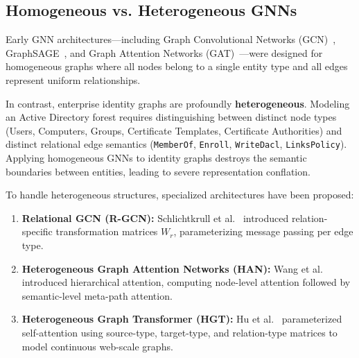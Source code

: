 \subsection{Homogeneous vs. Heterogeneous GNNs}
Early GNN architectures---including Graph Convolutional Networks (GCN)~\cite{kipf2017semi}, GraphSAGE~\cite{hamilton2017inductive}, and Graph Attention Networks (GAT)~\cite{velickovic2018graph}---were designed for homogeneous graphs where all nodes belong to a single entity type and all edges represent uniform relationships.

In contrast, enterprise identity graphs are profoundly \textbf{heterogeneous}. Modeling an Active Directory forest requires distinguishing between distinct node types (Users, Computers, Groups, Certificate Templates, Certificate Authorities) and distinct relational edge semantics (\texttt{MemberOf}, \texttt{Enroll}, \texttt{WriteDacl}, \texttt{LinksPolicy}). Applying homogeneous GNNs to identity graphs destroys the semantic boundaries between entities, leading to severe representation conflation.

To handle heterogeneous structures, specialized architectures have been proposed:
\begin{enumerate}
    \item \textbf{Relational GCN (R-GCN):} Schlichtkrull et al.~\cite{schlichtkrull2018modeling} introduced relation-specific transformation matrices $W_r$, parameterizing message passing per edge type.
    \item \textbf{Heterogeneous Graph Attention Networks (HAN):} Wang et al.~\cite{wang2019heterogeneous} introduced hierarchical attention, computing node-level attention followed by semantic-level meta-path attention.
    \item \textbf{Heterogeneous Graph Transformer (HGT):} Hu et al.~\cite{hu2020heterogeneous} parameterized self-attention using source-type, target-type, and relation-type matrices to model continuous web-scale graphs.
\end{enumerate}


